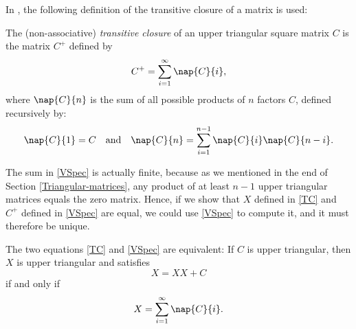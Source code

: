 In \citep{Valiant}, the following definition of the transitive closure of a matrix is used:
\begin{Definition}
  The (non-associative) \emph{transitive closure} of an upper triangular square matrix $C$ is the matrix $C^+$ defined by
  \begin{equation}\label{VSpec}
    C^+ = \sum_{i = 1}^\infty \nap{C}{i},
  \end{equation}
  where $\nap{C}{n}$ is the sum of all possible products of $n$ factors $C$, defined recursively by:
  \begin{equation*}
    \nap{C}{1} = C \quad \text{and} \quad \nap{C}{n} = \sum_{i = 1}^{n - 1}\nap{C}{i}\nap{C}{n - i}.
  \end{equation*}
\end{Definition}
The sum in \eqref{VSpec} is actually finite, because as we mentioned in the end of Section \ref{Triangular-matrices}, any product of at least $n -1$ upper triangular matrices equals the zero matrix. Hence, if we show that $X$ defined in \eqref{TC} and $C^+$ defined in \eqref{VSpec} are equal, we could use \eqref{VSpec} to compute it, and it must therefore be unique.
 \begin{Proposition}
   The two equations \eqref{TC} and \eqref{VSpec} are equivalent: If $C$ is upper triangular, then $X$ is upper triangular and satisfies
   \begin{equation}
     X = XX + C
   \end{equation}
   if and only if
   \begin{equation}
     X = \sum_{i = 1}^\infty \nap{C}{i}.
   \end{equation}
 \end{Proposition}
